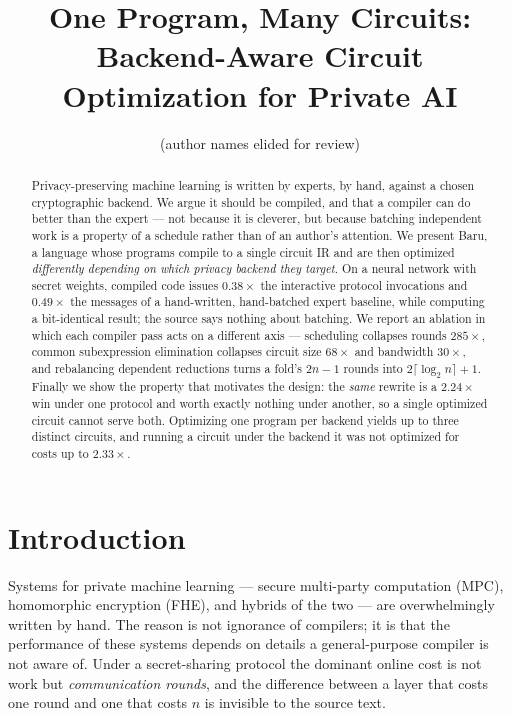 \documentclass[11pt]{article}
\title{\bfseries One Program, Many Circuits:\\
Backend-Aware Circuit Optimization for Private AI}
\author{(author names elided for review)}
\date{}
\begin{document}
\maketitle

\begin{abstract}
Privacy-preserving machine learning is written by experts, by hand, against a
chosen cryptographic backend. We argue it should be compiled, and that a
compiler can do better than the expert --- not because it is cleverer, but
because batching independent work is a property of a schedule rather than of
an author's attention. We present Baru, a language whose programs compile to
a single circuit IR and are then optimized \emph{differently depending on
which privacy backend they target}. On a neural network with secret weights,
compiled code issues $0.38\times$ the interactive protocol invocations and
$0.49\times$ the messages of a hand-written, hand-batched expert baseline,
while computing a bit-identical result; the source says nothing about
batching. We report an ablation in which each compiler pass acts on a
different axis --- scheduling collapses rounds $285\times$, common
subexpression elimination collapses circuit size $68\times$ and bandwidth
$30\times$, and rebalancing dependent reductions turns a fold's $2n-1$ rounds
into $2\lceil\log_2 n\rceil+1$. Finally we show the property that motivates
the design: the \emph{same} rewrite is a $2.24\times$ win under one protocol
and worth exactly nothing under another, so a single optimized circuit cannot
serve both. Optimizing one program per backend yields up to three distinct
circuits, and running a circuit under the backend it was not optimized for
costs up to $2.33\times$.
\end{abstract}

\section{Introduction}\label{sec:intro}

Systems for private machine learning --- secure multi-party computation (MPC),
homomorphic encryption (FHE), and hybrids of the two --- are overwhelmingly
written by hand. The reason is not ignorance of compilers; it is that the
performance of these systems depends on details a general-purpose compiler is
not aware of. Under a secret-sharing protocol the dominant online cost is not
work but \emph{communication rounds}, and the difference between a layer that
costs one round and one that costs $n$ is invisible to the source text.
\end{document}
